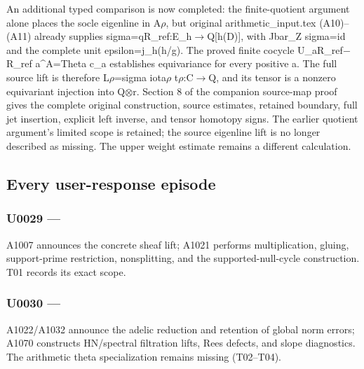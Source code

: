 \documentclass[10pt,a4paper,oneside]{report}
\begin{document}
An additional typed comparison is now completed: the finite-quotient
argument alone places the socle eigenline in
A\allowbreak{}\ensuremath{ρ}\allowbreak{}, but original
arithmetic\_input.tex (A10)--(A11) already supplies
sigma=qR\_ref:E\_h\allowbreak{}\ensuremath{→}\allowbreak{}Q[h(D)], with
Jbar\_Z sigma=id and the complete unit epsilon=j\_h(h/g). The proved
finite cocycle U\_aR\_ref\allowbreak{}\ensuremath{−}\allowbreak{}R\_ref
a\^{}A=Theta c\_a establishes equivariance for every positive a. The
full source lift is therefore
L\allowbreak{}\ensuremath{ρ}\allowbreak{}=sigma
iota\allowbreak{}\ensuremath{ρ}\allowbreak{}
t\allowbreak{}\ensuremath{ρ}\allowbreak{}:C\allowbreak{}\ensuremath{→}\allowbreak{}Q,
and its tensor is a nonzero equivariant injection into
Q\allowbreak{}\ensuremath{⊗}\allowbreak{}r. Section 8 of the companion
source-map proof gives the complete original construction, source
estimates, retained boundary, full jet insertion, explicit left inverse,
and tensor homotopy signs. The earlier quotient argument's limited scope
is retained; the source eigenline lift is no longer described as
missing. The upper weight estimate remains a different calculation.

\subsection{Every user-response
episode}\label{every-user-response-episode}

\subsubsection{\texorpdfstring{U0029 ---
\protect{}}{U0029 --- }}\label{u0029-53352f69-6c38-4cab-a6aa-c225647ebe9a}

A1007 announces the concrete sheaf lift; A1021 performs multiplication,
gluing, support-prime restriction, nonsplitting, and the
supported-null-cycle construction. T01 records its exact scope.

\subsubsection{\texorpdfstring{U0030 ---
\protect{}}{U0030 --- }}\label{u0030-2e3cac15-6cbf-4fbd-b826-ceed04867399}

A1022/A1032 announce the adelic reduction and retention of global norm
errors; A1070 constructs HN/spectral filtration lifts, Rees defects, and
slope diagnostics. The arithmetic theta specialization remains missing
(T02--T04).
\end{document}
